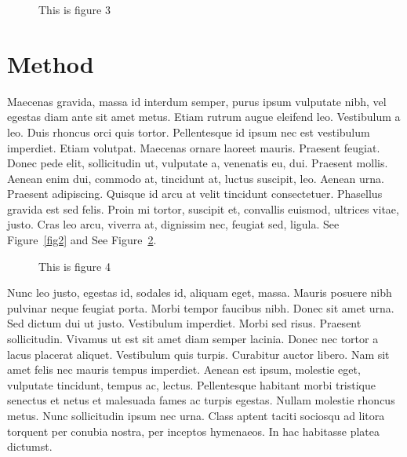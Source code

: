 \documentclass{report}
\begin{document}
\begin{figure}[h]
\begin{center}
\vspace{2cm}
\label{fig3}
\caption{This is figure 3}
\end{center}
\end{figure}

\section{Method}
Maecenas gravida, massa id interdum semper, purus ipsum vulputate nibh, vel
egestas diam ante sit amet metus. Etiam rutrum augue eleifend leo. Vestibulum a
leo. Duis rhoncus orci quis tortor. Pellentesque id ipsum nec est vestibulum
imperdiet. Etiam volutpat. Maecenas ornare laoreet mauris. Praesent feugiat.
Donec pede elit, sollicitudin ut, vulputate a, venenatis eu, dui. Praesent
mollis. Aenean enim dui, commodo at, tincidunt at, luctus suscipit, leo. Aenean
urna. Praesent adipiscing. Quisque id arcu at velit tincidunt consectetuer.
Phasellus gravida est sed felis. Proin mi tortor, suscipit et, convallis
euismod, ultrices vitae, justo. Cras leo arcu, viverra at, dignissim nec,
feugiat sed, ligula.  See Figure~\ref{fig2} and See Figure~\ref{fig4}.

\begin{figure}[h]
\begin{center}
\vspace{2cm}
\label{fig4}
\caption{This is figure 4}
\end{center}
\end{figure}

Nunc leo justo, egestas id, sodales id, aliquam eget, massa. Mauris posuere nibh
pulvinar neque feugiat porta. Morbi tempor faucibus nibh. Donec sit amet urna.
Sed dictum dui ut justo. Vestibulum imperdiet. Morbi sed risus. Praesent
sollicitudin. Vivamus ut est sit amet diam semper lacinia. Donec nec tortor a
lacus placerat aliquet. Vestibulum quis turpis. Curabitur auctor libero. Nam sit
amet felis nec mauris tempus imperdiet. Aenean est ipsum, molestie eget,
vulputate tincidunt, tempus ac, lectus. Pellentesque habitant morbi tristique
senectus et netus et malesuada fames ac turpis egestas. Nullam molestie rhoncus
metus. Nunc sollicitudin ipsum nec urna. Class aptent taciti sociosqu ad litora
torquent per conubia nostra, per inceptos hymenaeos. In hac habitasse platea
dictumst. 
\end{document}
